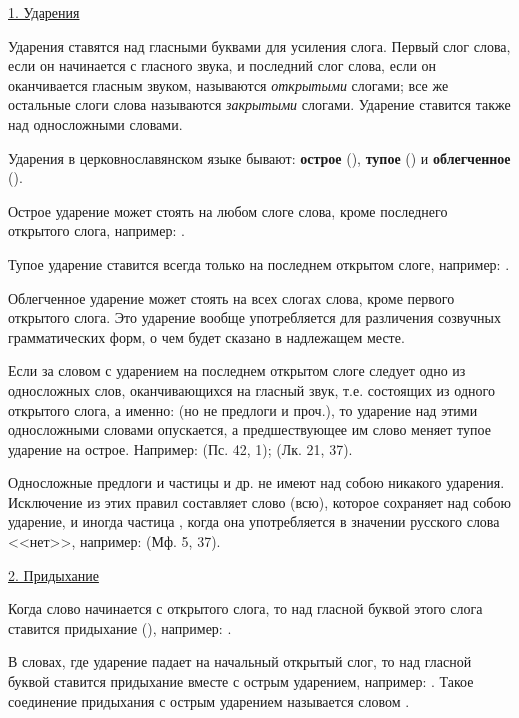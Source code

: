 \documentclass[11pt,a4paper,oneside]{memoir}
\begin{document}
    \medskip
    \underline{1. Ударения}    
    \medskip

    Ударения ставятся над гласными буквами для усиления слога. Первый слог слова, если он начинается с гласного звука, и последний слог слова, если он оканчивается гласным звуком, называются \emph{открытыми} слогами; все же остальные слоги слова называются \emph{закрытыми} слогами. Ударение ставится также над односложными словами.
    
    Ударения в церковнославянском языке бывают: \textbf{острое} ({}), \textbf{тупое} ({}) и \textbf{облегченное} ({}).
    
    Острое ударение может стоять на любом слоге слова, кроме последнего открытого слога, например: {}.
    
    Тупое ударение ставится всегда только на последнем открытом слоге, например: {}.
    
    Облегченное ударение может стоять на всех слогах слова, кроме первого открытого слога. Это ударение вообще употребляется для различения созвучных грамматических форм, о чем будет сказано в надлежащем месте.
    
    Если за словом с ударением на последнем открытом слоге следует одно из односложных слов, оканчивающихся на гласный звук, т.е. состоящих из одного открытого слога, а именно: {} (но не предлоги {} и проч.), то ударение над этими односложными словами опускается, а предшествующее им слово меняет тупое ударение на острое. Например: {} (Пс. 42, 1); {} (Лк. 21, 37).
    
    Односложные предлоги и частицы {} и др. не имеют над собою никакого ударения. Исключение из этих правил составляет слово {} (всю), которое сохраняет над собою ударение, и иногда частица {}, когда она употребляется в значении русского слова <<нет>>, например: {} (Мф. 5, 37).
    
    \medskip
    \underline{2. Придыхание}
    \medskip
    
    Когда слово начинается с открытого слога, то над гласной буквой этого слога ставится придыхание ({}), например: {}.
    
    В словах, где ударение падает на начальный открытый слог, то над гласной буквой ставится придыхание вместе с острым ударением, например: {}. Такое соединение придыхания с острым ударением называется словом {}.
    
\end{document}
